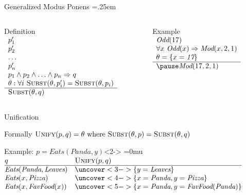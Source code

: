 \documentclass[14pt]{beamer}
\begin{document}
\begin{frame}{Generalized Modus Ponens}
\small
\extrarowheight=.25em
\begin{columns}[T]
\begin{column}{0.5\textwidth}
\begin{block}{Definition}
$
\begin{array}{l}
p_1' \\
p_2' \\
\ldots \\
p_n' \\
p_1 \land p_2 \land \ldots \land p_n \Rightarrow q \\
\theta : \forall i\ \textsc{Subst}(\theta, p_i') = \textsc{Subst}(\theta, p_i)\\
\hline
\textsc{Subst}(\theta, q)
\end{array}
$
\end{block}
\end{column}
\pause
\begin{column}{0.45\textwidth}
\begin{block}{Example}
$
\begin{array}{l}
\textit{Odd}(17) \\
\forall x\ \textit{Odd}(x) \limpl \textit{Mod}(x, 2, 1) \\
\theta = \{x = \textit{17}\} \\
\hline
\pause\textit{Mod}(17, 2, 1)
\end{array}
$
\end{block}
\end{column}
\end{columns}
\end{frame}

\begin{frame}{Unification}
\begin{block}{Formally}
$\textsc{Unify}(p, q) = \theta \mbox{ where } \textsc{Subst}(\theta, p) = \textsc{Subst}(\theta, q)$
\end{block}
\bigskip
\begin{block}{Example: $p=\textit{Eats}(\textit{Panda}, y)$}<2->
\thickmuskip=0mu
\medskip
$
\begin{array}{@{} l l @{}}
q & \textsc{Unify}(p, q) \\
\hline
\textit{Eats}(\textit{Panda}, \textit{Leaves})
& \uncover<3->{\{y=\textit{Leaves}\}}
\\
\textit{Eats}(x, \textit{Pizza})
& \uncover<4->{\{x=\textit{Panda}, y=\textit{Pizza}\}}
\\
\textit{Eats}(x, \textit{FavFood}(x))
& \uncover<5->{\{x=\textit{Panda}, y=\textit{FavFood}(\textit{Panda})\}}
\end{array}
$
\end{block}
\end{frame}
\end{document}

